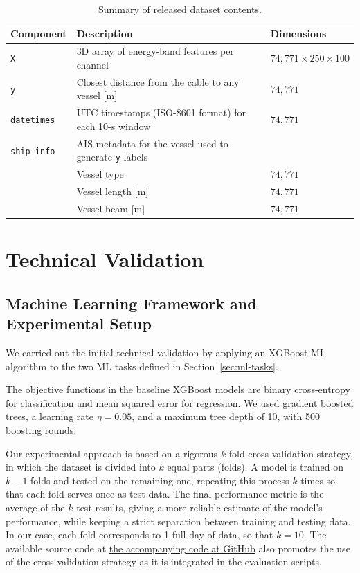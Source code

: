 \documentclass[11pt]{article}
\begin{document}
\begin{table}[H]
  \centering
  \caption{Summary of released dataset contents.}
  \label{tab:dataset-content}
  \begin{tabularx}{\linewidth}{@{}lXl@{}}\toprule
  \textbf{Component} & \textbf{Description} & \textbf{Dimensions} \\ \midrule
  \texttt{X} & 3D array of energy-band features per channel & $74{,}771 \times 250 \times 100$ \\
  \texttt{y} & Closest distance from the cable to any vessel [m] & $74{,}771$ \\
  \texttt{datetimes} & UTC timestamps (ISO-8601 format) for each 10-s window & $74{,}771$ \\
    \texttt{ship\_info} & AIS metadata for the vessel used to generate \texttt{y} labels &  \\
    & Vessel type & $74{,}771$ \\
    & Vessel length [m] & $74{,}771$ \\
    & Vessel beam [m] & $74{,}771$ \\
\bottomrule
  \end{tabularx}
\end{table}


\section{Technical Validation}
\label{sec:technical validation}



\subsection{Machine Learning Framework and Experimental Setup}
\label{sec:machine learning framework}

We carried out the initial technical validation by applying an XGBoost ML algorithm to the two ML tasks defined in Section~\ref{sec:ml-tasks}.

The objective functions in the baseline XGBoost models are binary cross-entropy for classification and mean squared error for regression. We used gradient boosted trees, a learning rate $\eta = 0.05$, and a maximum tree depth of 10, with 500 boosting rounds.

Our experimental approach is based on a rigorous $k$-fold cross-validation strategy, in which the dataset is divided into $k$ equal parts (folds). A model is trained on $k-1$ folds and tested on the remaining one, repeating this process $k$ times so that each fold serves once as test data. The final performance metric is the average of the $k$ test results, giving a more reliable estimate of the model’s performance, while keeping a strict separation between training and testing data. In our case, each fold corresponds to 1 full day of data, so that $k=10$. The available source code at \href{https://github.com/UAH-PSI/das-vessel-detection}{the accompanying code at GitHub} also promotes the use of the cross-validation strategy as it is integrated in the evaluation scripts.
\end{document}
